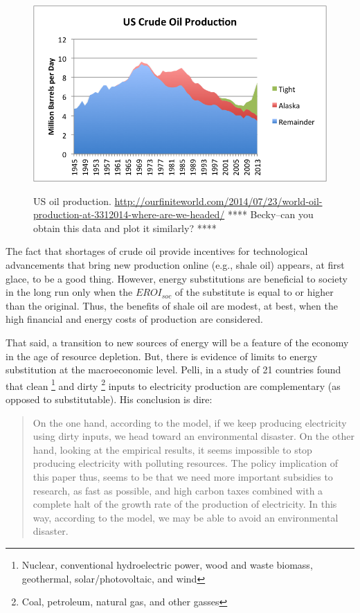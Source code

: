 \begin{figure}[!ht]
\centering\
\includegraphics[width=\linewidth]{Part_0/Chapter_Introduction/images/us-crude-oil-production-including-tight-oil.png}
\caption[US oil production]{US oil production.
\url{http://ourfiniteworld.com/2014/07/23/world-oil-production-at-3312014-where-are-we-headed/}
**** Becky--can you obtain this data and plot it similarly? ****
}
\label{fig:US_oil_production}
\end{figure}

The fact that shortages of crude oil provide incentives for 
technological advancements that bring new production online (e.g., shale oil)
appears, at first glace, to be a good thing.
However, energy substitutions are beneficial to society 
in the long run only when the $EROI_{soc}$ of the substitute
is equal to or higher than the original.
Thus, the benefits of shale oil are modest, at best, when the
high financial and energy costs of production are considered.

That said, a transition to new sources of energy will be a feature 
of the economy in the age of resource depletion.
But, there is evidence of limits to energy substitution 
at the macroeconomic level.
Pelli, in a study of 21 countries 
found that clean%
	\footnote{
	Nuclear, 
	conventional hydroelectric power, wood and waste biomass, 
	geothermal, solar/photovoltaic, and wind
	}
and dirty%
	\footnote{
	Coal, 
	petroleum, natural gas, and other gasses
	}
inputs to electricity production
are complementary (as opposed to substitutable).\cite{Pelli:2012wv}
His conclusion is dire:
%
\begin{quote}
	On the one hand, according to the model, 
	if we keep producing electricity using dirty inputs, 
	we head toward an environmental disaster. 
	On the other hand, looking at the empirical results, 
	it seems impossible to stop producing electricity with polluting resources. 
	The policy implication of this paper thus, 
	seems to be that we need more important subsidies to research, 
	as fast as possible, 
	and high carbon taxes combined with a complete halt 
	of the growth rate of the production of electricity. 
	In this way, according to the model, 
	we may be able to avoid an environmental disaster.\cite[p.~25]{Pelli:2012wv}
\end{quote}

